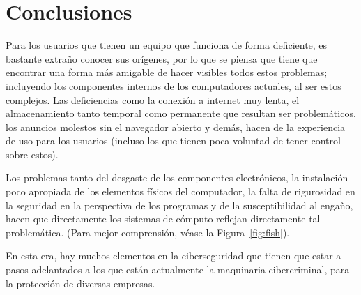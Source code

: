 \pagebreak
\section{Conclusiones}
Para los usuarios que tienen un equipo que funciona de forma deficiente, es
bastante extraño conocer sus orígenes, por lo que se piensa que tiene que
encontrar una forma más amigable de hacer visibles todos estos problemas;
incluyendo los componentes internos de los computadores actuales, al ser estos
complejos. Las deficiencias como la conexión a internet muy lenta, el
almacenamiento tanto temporal como permanente que resultan ser problemáticos,
los anuncios molestos sin el navegador abierto y demás, hacen de la
experiencia de uso para los usuarios (incluso los que tienen poca voluntad de
tener control sobre estos).

Los problemas tanto del desgaste de los componentes electrónicos, la instalación
poco apropiada de los elementos físicos del computador, la falta de rigurosidad
en la seguridad en la perspectiva de los programas y de la susceptibilidad al
engaño, hacen que directamente los sistemas de cómputo reflejan directamente tal
problemática. (Para mejor comprensión, véase la Figura~\ref{fig:fish}).

En esta era, hay muchos elementos en la ciberseguridad que tienen que estar
a pasos adelantados a los que están actualmente la maquinaria cibercriminal,
para la protección de diversas empresas.
